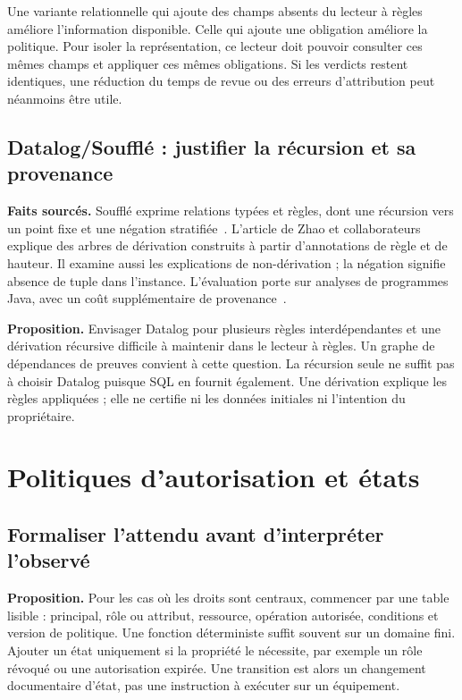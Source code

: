 \documentclass[11pt,a4paper]{article}
\begin{document}
Une variante relationnelle qui ajoute des champs absents du lecteur à règles améliore
l'information disponible. Celle qui ajoute une obligation améliore la politique.
Pour isoler la représentation, ce lecteur doit pouvoir consulter ces mêmes champs et
appliquer ces mêmes obligations. Si les verdicts restent identiques, une réduction
du temps de revue ou des erreurs d'attribution peut néanmoins être utile.

\subsection{Datalog/Soufflé : justifier la récursion et sa provenance}
\textbf{Faits sourcés.} Soufflé exprime relations typées et règles, dont une
récursion vers un point fixe et une négation stratifiée~\cite{souffle}.
L'article de Zhao et collaborateurs explique des arbres de dérivation construits
à partir d'annotations de règle et de hauteur. Il examine aussi les explications
de non-dérivation ; la négation signifie absence de tuple dans l'instance.
L'évaluation porte sur analyses de programmes Java, avec un coût supplémentaire
de provenance~\cite{provenance}.

\textbf{Proposition.} Envisager Datalog pour plusieurs règles interdépendantes
et une dérivation récursive difficile à maintenir dans le lecteur à règles.
Un graphe de dépendances
de preuves convient à cette question. La récursion seule ne suffit pas à choisir
Datalog puisque SQL en fournit également. Une dérivation explique les règles
appliquées ; elle ne certifie ni les données initiales ni l'intention du propriétaire.

\section{Politiques d'autorisation et états}
\subsection{Formaliser l'attendu avant d'interpréter l'observé}
\textbf{Proposition.} Pour les cas où les droits sont centraux, commencer par
une table lisible : principal, rôle ou attribut, ressource, opération autorisée,
conditions et version de politique. Une fonction déterministe suffit souvent
sur un domaine fini. Ajouter un état uniquement si la propriété le nécessite,
par exemple un rôle révoqué ou une autorisation expirée. Une transition est
alors un changement documentaire d'état, pas une instruction à exécuter sur
un équipement.
\end{document}
